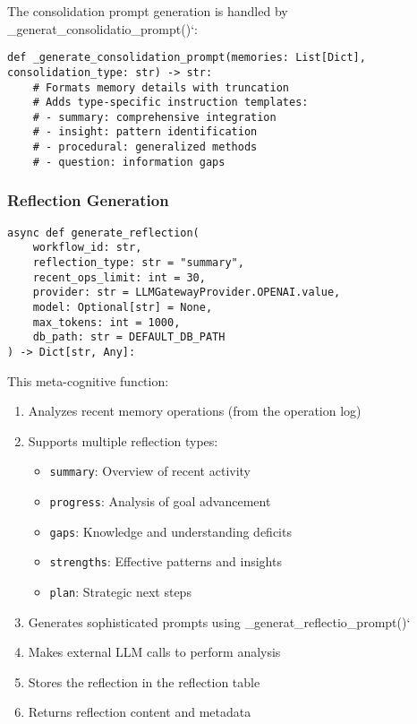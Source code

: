\documentclass[12pt,a4paper]{article}
\newcommand{\code}[1]{\texttt{#1}}
\begin{document}
The consolidation prompt generation is handled by \1\_generat\1\_consolidatio\1\_prompt()`:
\begin{pageablecode}
\begin{verbatim}
def _generate_consolidation_prompt(memories: List[Dict], consolidation_type: str) -> str:
    # Formats memory details with truncation
    # Adds type-specific instruction templates:
    # - summary: comprehensive integration
    # - insight: pattern identification
    # - procedural: generalized methods
    # - question: information gaps
\end{verbatim}
\end{pageablecode}

\subsubsection*{Reflection Generation}
\begin{pageablecode}
\begin{verbatim}
async def generate_reflection(
    workflow_id: str,
    reflection_type: str = "summary",
    recent_ops_limit: int = 30,
    provider: str = LLMGatewayProvider.OPENAI.value,
    model: Optional[str] = None,
    max_tokens: int = 1000,
    db_path: str = DEFAULT_DB_PATH
) -> Dict[str, Any]:
\end{verbatim}
\end{pageablecode}
This meta-cognitive function:
\begin{enumerate}[label=\arabic*.]
    \item Analyzes recent memory operations (from the operation log)
    \item Supports multiple reflection types:
    \begin{itemize}
        \item \code{summary}: Overview of recent activity
        \item \code{progress}: Analysis of goal advancement
        \item \code{gaps}: Knowledge and understanding deficits
        \item \code{strengths}: Effective patterns and insights
        \item \code{plan}: Strategic next steps
    \end{itemize}
    \item Generates sophisticated prompts using \1\_generat\1\_reflectio\1\_prompt()`
    \item Makes external LLM calls to perform analysis
    \item Stores the reflection in the reflection table
    \item Returns reflection content and metadata
\end{enumerate}
\end{document}
